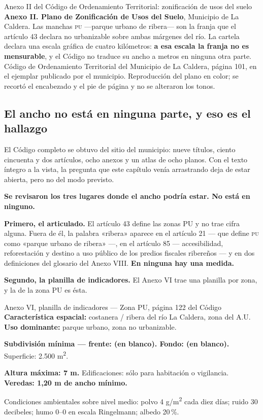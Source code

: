 %
{Anexo II del Código de Ordenamiento Territorial: zonificación de usos del suelo}%
{\textbf{Anexo II. Plano de Zonificación de Usos del Suelo}, Municipio de La Caldera. Las
manchas \textsc{pu} ---parque urbano de ribera--- son la franja que el artículo 43 declara no
urbanizable sobre ambas márgenes del río. La cartela declara una escala gráfica de cuatro
kilómetros: \textbf{a esa escala la franja no es mensurable}, y el Código no traduce su ancho
a metros en ninguna otra parte.}%
{Código de Ordenamiento Territorial del Municipio de La Caldera, página 101, en el ejemplar
publicado por el municipio. Reproducción del plano en color; se recortó el encabezado y el pie
de página y no se alteraron los tonos.}

\subsection*{El ancho no está en ninguna parte, y eso es el hallazgo}

El Código completo se obtuvo del sitio del municipio: nueve títulos, ciento cincuenta y dos
artículos, ocho anexos y un atlas de ocho planos. Con el texto íntegro a la vista, la pregunta
que este capítulo venía arrastrando deja de estar abierta, pero no del modo previsto.

\textbf{Se revisaron los tres lugares donde el ancho podría estar. No está en ninguno.}

\textbf{Primero, el articulado.} El artículo 43 define las zonas PU y no trae cifra alguna.
Fuera de él, la palabra «ribera» aparece en el artículo 21 --- que define \textsc{pu} como
«parque urbano de ribera» ---, en el artículo 85 --- accesibilidad, reforestación y destino a
uso público de los predios fiscales ribereños --- y en dos definiciones del glosario del
Anexo VIII. \textbf{En ninguna hay una medida.}

\textbf{Segundo, la planilla de indicadores.} El Anexo VI trae una planilla por zona, y la de
la zona PU es ésta.

\begin{ficha}{Anexo VI, planilla de indicadores --- Zona PU, página 122 del Código}
\textbf{Característica espacial:} costanera / ribera del río La Caldera, zona del A.U.
\textbf{Uso dominante:} parque urbano, zona no urbanizable.

\textbf{Subdivisión mínima --- frente: (en blanco). Fondo: (en blanco).} Superficie:
2.500 m\textsuperscript{2}.

\textbf{Altura máxima: 7 m.} Edificaciones: sólo para habitación o vigilancia.
\textbf{Veredas: 1,20 m de ancho mínimo.}

Condiciones ambientales sobre nivel medio: polvo 4 g/m\textsuperscript{2} cada diez días;
ruido 30 decibeles; humo 0--0 en escala Ringelmann; albedo 20\,\%.
\end{ficha}

